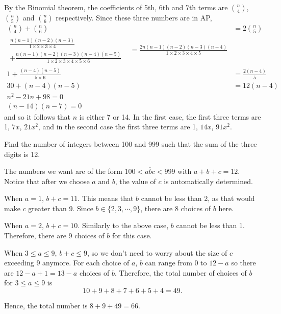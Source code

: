 \begin{solution}
    By the Binomial theorem, the coefficients of 5th, 6th and 7th terms are
    $\binom{n}{4}$, $\binom{n}{5}$ and $\binom{n}{6}$ respectively. Since these
    three numbers are in AP,
    \begin{align*}
        \binom{n}{4} + \binom{n}{6} &= 2\binom{n}{5}\\
        \begin{split}
            \frac{n(n - 1)(n - 2)(n - 3)}{1 \times 2 \times 3 \times 4}\\
            + \frac{n(n - 1)(n - 2)(n - 3)(n - 4)(n - 5)}{1 \times 2 \times 3 \times 4 \times 5 \times 6} &
        \end{split} 
        = \frac{2n(n - 1)(n - 2)(n - 3)(n - 4)}{1 \times 2 \times 3 \times 4 \times 5}\\
        1 + \frac{(n - 4)(n - 5)}{5 \times 6} &= \frac{2(n - 4)}{5}\\
        30 + (n - 4)(n - 5) &= 12(n - 4)\\
        n^2 - 21n + 98 = 0\\
        (n - 14)(n - 7) = 0
    \end{align*}
    and so it follows that $n$ is either 7 or 14. In the first case, the first
    three terms are 1, $7x$, $21x^2$, and in the second case the first three
    terms are 1, $14x$, $91x^2$.
\end{solution}

\begin{question}
    Find the number of integers between 100 and 999 such that the sum of the
    three digits is 12.
\end{question}
\begin{solution}
    The numbers we want are of the form $100 < \overline{abc} < 999$ with $a +
    b + c = 12$. Notice that after we choose $a$ and $b$, the value of $c$ is
    automatically determined. 
    
    When $a = 1$, $b + c = 11$. This means that $b$ cannot be less than 2, as
    that would make $c$ greater than 9. Since $b \in \{2, 3, \cdots, 9\}$,
    there are 8 choices of $b$ here.

    When $a = 2$, $b + c = 10$. Similarly to the above case, $b$ cannot be less
    than 1. Therefore, there are 9 choices of $b$ for this case.

    When $3 \leq a \leq 9$, $b + c \leq 9$, so we don't need to worry about the
    size of $c$ exceeding 9 anymore. For each choice of $a$, $b$ can range from
    0 to $12 - a$ so there are $12 - a + 1 = 13 - a$ choices of $b$. Therefore,
    the total number of choices of $b$ for $3 \leq a \leq 9$ is 
    \[10 + 9 + 8 + 7 + 6 + 5 + 4 = 49.\] 

    Hence, the total number is $8 + 9 + 49 = 66$.
\end{solution}

